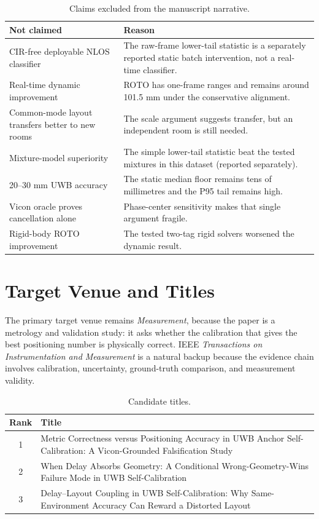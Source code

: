 \documentclass[11pt,a4paper]{article}
\begin{document}
\begin{table}[h]
\centering
\caption{Claims excluded from the manuscript narrative.}
\small
\begin{tabular}{@{}p{49mm}p{88mm}@{}}
\toprule
Not claimed & Reason \\
\midrule
CIR-free deployable NLOS classifier & The raw-frame lower-tail statistic is a separately reported static batch intervention, not a real-time classifier. \\
Real-time dynamic improvement & ROTO has one-frame ranges and remains around 101.5 mm under the conservative alignment. \\
Common-mode layout transfers better to new rooms & The scale argument suggests transfer, but an independent room is still needed. \\
Mixture-model superiority & The simple lower-tail statistic beat the tested mixtures in this dataset (reported separately). \\
20--30 mm UWB accuracy & The static median floor remains tens of millimetres and the P95 tail remains high. \\
Vicon oracle proves cancellation alone & Phase-center sensitivity makes that single argument fragile. \\
Rigid-body ROTO improvement & The tested two-tag rigid solvers worsened the dynamic result. \\
\bottomrule
\end{tabular}
\end{table}

\section{Target Venue and Titles}

The primary target venue remains \emph{Measurement}, because the paper is a metrology and validation study: it asks whether the calibration that gives the best positioning number is physically correct. IEEE \emph{Transactions on Instrumentation and Measurement} is a natural backup because the evidence chain involves calibration, uncertainty, ground-truth comparison, and measurement validity.

\begin{table}[h]
\centering
\caption{Candidate titles.}
\begin{tabular}{@{}cp{119mm}@{}}
\toprule
Rank & Title \\
\midrule
1 & Metric Correctness versus Positioning Accuracy in UWB Anchor Self-Calibration: A Vicon-Grounded Falsification Study \\
2 & When Delay Absorbs Geometry: A Conditional Wrong-Geometry-Wins Failure Mode in UWB Self-Calibration \\
3 & Delay--Layout Coupling in UWB Self-Calibration: Why Same-Environment Accuracy Can Reward a Distorted Layout \\
\bottomrule
\end{tabular}
\end{table}
\end{document}
